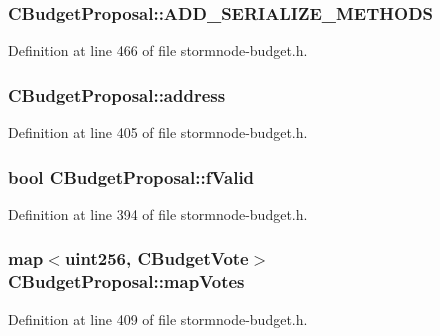 \subsubsection[{A\+D\+D\+\_\+\+S\+E\+R\+I\+A\+L\+I\+Z\+E\+\_\+\+M\+E\+T\+H\+O\+D\+S}]{\setlength{\rightskip}{0pt plus 5cm}C\+Budget\+Proposal\+::\+A\+D\+D\+\_\+\+S\+E\+R\+I\+A\+L\+I\+Z\+E\+\_\+\+M\+E\+T\+H\+O\+D\+S}\label{class_c_budget_proposal_ad35aca18a74a65dd6df2a04536253174}


Definition at line 466 of file stormnode-\/budget.\+h.

\hypertarget{class_c_budget_proposal_abec3e0b5b46ac1a8aad65b4144b87782}{}
\subsubsection[{address}]{ C\+Budget\+Proposal\+::address}\label{class_c_budget_proposal_abec3e0b5b46ac1a8aad65b4144b87782}


Definition at line 405 of file stormnode-\/budget.\+h.

\hypertarget{class_c_budget_proposal_ab2222fd5e4fc51881d82b9c7dc6a0f10}{}
\subsubsection[{f\+Valid}]{\setlength{\rightskip}{0pt plus 5cm}bool C\+Budget\+Proposal\+::f\+Valid}\label{class_c_budget_proposal_ab2222fd5e4fc51881d82b9c7dc6a0f10}


Definition at line 394 of file stormnode-\/budget.\+h.

\hypertarget{class_c_budget_proposal_a83239972ab9db545206ac7e59740bfab}{}
\subsubsection[{map\+Votes}]{\setlength{\rightskip}{0pt plus 5cm}map$<${\bf uint256}, {\bf C\+Budget\+Vote}$>$ C\+Budget\+Proposal\+::map\+Votes}\label{class_c_budget_proposal_a83239972ab9db545206ac7e59740bfab}


Definition at line 409 of file stormnode-\/budget.\+h.

